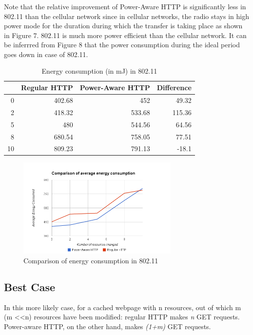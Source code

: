 \documentclass{sigplanconf}
\begin{document}
Note that the relative improvement of Power-Aware HTTP is significantly less in 802.11 than the cellular network since in cellular networks, the radio stays in high power mode for the duration during which the transfer is taking place as shown in Figure 7. 802.11 is much more power efficient than the cellular network. It can be inferrred from Figure 8 that the power consumption during the ideal period goes down in case of 802.11.

\begin{table}[htbp]
\centering
\caption{Energy consumption (in mJ) in 802.11}
\begin{tabular}{|r|r|r|r|}
\hline
\multicolumn{1}{|l|}{} & \multicolumn{1}{l|}{Regular HTTP} & \multicolumn{1}{l|}{Power-Aware HTTP} & \multicolumn{1}{l|}{Difference} \\ \hline
0 & 402.68 & 452 & 49.32 \\ \hline
2 & 418.32 & 533.68 & 115.36 \\ \hline
5 & 480 & 544.56 & 64.56 \\ \hline
8 & 680.54 & 758.05 & 77.51 \\ \hline
10 & 809.23 & 791.13 & -18.1 \\ \hline
\end{tabular}
\label{}
\end{table}

\begin{figure}[ht!]
\centering
\includegraphics[width=80mm]{avg_energy_wifi.png}
\caption{Comparison of energy consumption in 802.11}
\label{fig:sp_gd_mnist}
\end{figure}


\subsection{Best Case}

In this more likely case, for a cached webpage with n resources, out of which m (m \textless \textless n) resources have been modified: regular HTTP makes {\it n} GET requests. Power-aware HTTP, on the other hand, makes {\it (1+m)} GET requests.
\end{document}
